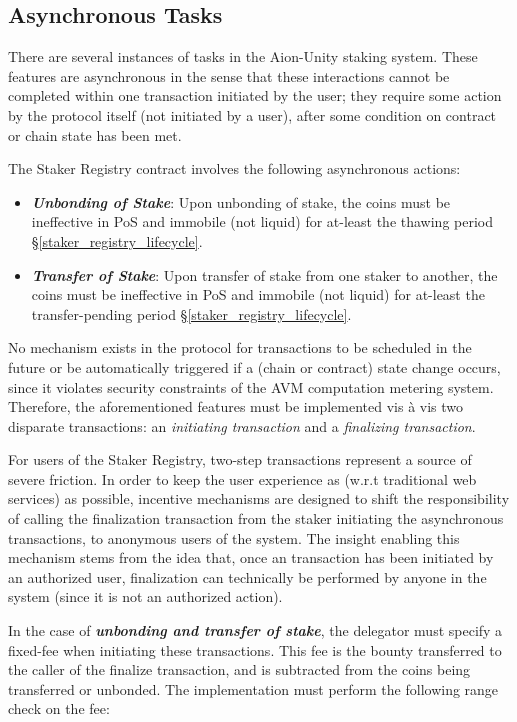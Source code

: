 \clearpage
\subsection{Asynchronous Tasks} \label{async_staker_registry}

There are several instances of  tasks in the Aion-Unity staking system. These features are asynchronous in the sense that these interactions cannot be completed within one transaction initiated by the user; they require some action by the protocol itself (not initiated by a user), after some condition on contract or chain state has been met.   

The Staker Registry contract involves the following asynchronous actions: 
\begin{itemize}
    \item \textit{\textbf{Unbonding of Stake}}: Upon unbonding of stake, the coins must be ineffective in PoS and immobile (not liquid) for at-least the thawing period \S\ref{staker_registry_lifecycle}.
    \item \textit{\textbf{Transfer of Stake}}: Upon transfer of stake from one staker to another, the coins must be ineffective in PoS and immobile (not liquid) for at-least the transfer-pending period \S\ref{staker_registry_lifecycle}. 
\end{itemize}

No mechanism exists in the protocol for transactions to be scheduled in the future or be automatically triggered if a (chain or contract) state change occurs, since it violates security constraints of the AVM computation metering system. Therefore, the aforementioned features must be implemented vis à vis two disparate transactions: an \textit{initiating transaction} and a \textit{finalizing transaction}. 

For users of the Staker Registry, two-step transactions represent a source of severe friction. In order to keep the user experience as  (w.r.t traditional web services) as possible, incentive mechanisms are designed to shift the responsibility of calling the finalization transaction from the staker initiating the asynchronous transactions, to anonymous users of the system. The insight enabling this mechanism stems from the idea that, once an  transaction has been initiated by an authorized user, finalization can technically be performed by anyone in the system (since it is not an authorized action).

In the case of \textbf{\textit{unbonding and transfer of stake}}, the delegator must specify a fixed-fee when initiating these transactions. This fee is the bounty transferred to the caller of the finalize transaction, and is subtracted from the coins being transferred or unbonded. The implementation must perform the following range check on the fee: 

